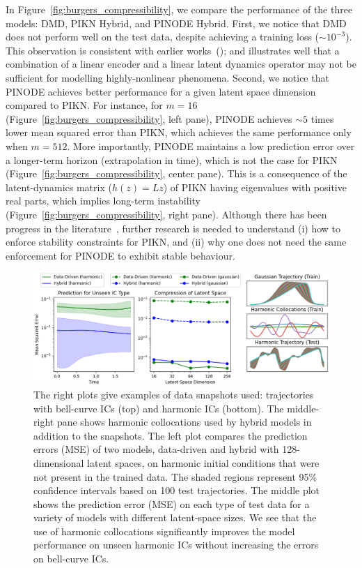 In Figure~\ref{fig:burgers_compressibility}, we compare the performance of the three models: DMD, PIKN Hybrid, and PINODE Hybrid. First, we notice that DMD does not perform well on the test data, despite achieving a training loss ($\sim 10^{-3}$). This observation is consistent with earlier works~(\cite{kalur2021robust,kutz2016dynamic}); and illustrates well that a combination of a linear encoder and a linear latent dynamics operator may not be sufficient for modelling highly-nonlinear phenomena. Second, we notice that PINODE achieves better performance for a given latent space dimension compared to PIKN. For instance, for $m = 16$ (Figure~\ref{fig:burgers_compressibility}, left pane), PINODE achieves $\sim 5$ times lower mean squared error than PIKN, which achieves the same performance only when $m = 512$. More importantly, PINODE maintains a low prediction error over a longer-term horizon (extrapolation in time), which is not the case for PIKN (Figure~\ref{fig:burgers_compressibility}, center pane). This is a consequence of the latent-dynamics matrix ($h(z) = Lz$) of PIKN having eigenvalues with positive real parts, which implies long-term instability (Figure~\ref{fig:burgers_compressibility}, right pane). Although there has been progress in the literature~\cite{kojimalearning}, further research is needed to understand (i) how to enforce stability constraints for PIKN, and (ii) why one does not need the same enforcement for PINODE to exhibit stable behaviour. 

	\begin{figure}[ht!]
        \centering
        \includegraphics[width=\textwidth]{figures/burgers_compression.png}
        \caption{The right plots give examples of data snapshots used: trajectories with bell-curve ICs (top) and harmonic ICs (bottom). The middle-right pane shows harmonic collocations used by hybrid models in addition to the snapshots. The left plot compares the prediction errors (MSE) of two models, data-driven and hybrid with 128-dimensional latent spaces, on harmonic initial conditions that were not present in the trained data. The shaded regions represent 95\% confidence intervals based on 100 test trajectories. The middle plot shows the prediction error (MSE) on each type of test data for a variety of models with different latent-space sizes. We see that the use of harmonic collocations significantly improves the model performance on unseen harmonic ICs without increasing the errors on bell-curve ICs.}
        \label{fig:pikn_burgers_compression}
    \end{figure}
    
